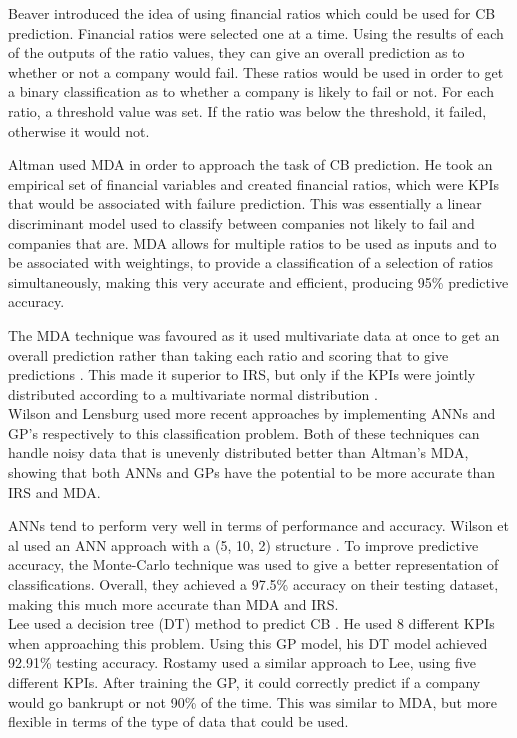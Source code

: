 \documentclass[11pt]{article}
\begin{document}
Beaver introduced the idea of using financial ratios which could be used for CB prediction. Financial ratios were selected one at a time. Using the results of each of the outputs of the ratio values, they can give an overall prediction as to whether or not a company would fail. These ratios would be used in order to get a binary classification as to whether a company is likely to fail or not. For each ratio, a threshold value was set. If the ratio was below the threshold, it failed, otherwise it would not.

Altman used MDA in order to approach the task of CB prediction. He took an empirical set of financial variables and created financial ratios, which were KPIs that would be associated with failure prediction. This was essentially a linear discriminant model used to classify between companies not likely to fail and companies that are. MDA allows for multiple ratios to be used as inputs and to be associated with weightings, to provide a classification of a selection of ratios simultaneously, making this very accurate and efficient, producing 95\% predictive accuracy. 

The MDA technique was favoured as it used multivariate data at once to get an overall prediction rather than taking each ratio and scoring that to give predictions \cite{ref-six}. This made it superior to IRS, but only if the KPIs were jointly distributed according to a multivariate normal distribution \cite{ref-nine}. \\
Wilson  \cite{ref-nine} and Lensburg \cite{ref-ten} used more recent approaches by implementing ANNs and GP's respectively to this classification problem. Both of these techniques can handle noisy data that is unevenly distributed better than Altman's MDA, showing that both ANNs and GPs have the potential to be more accurate than IRS and MDA. 

ANNs tend to perform very well in terms of performance and accuracy. Wilson et al used an ANN approach with a (5, 10, 2) structure \cite{ref-nine}. To improve predictive accuracy, the Monte-Carlo technique was used to give a better representation of classifications. Overall, they achieved a 97.5\% accuracy on their testing dataset, making this much more accurate than MDA and IRS. \\
Lee used a decision tree (DT) method to predict CB \cite{ref-eleven}. He used 8 different KPIs when approaching this problem. Using this GP model, his DT model achieved 92.91\% testing accuracy. Rostamy \cite{ref-twelve} used a similar approach to Lee, using five different KPIs. After training the GP, it could correctly predict if a company would go bankrupt or not 90\% of the time. This was similar to MDA, but more flexible in terms of the type of data that could be used.
\end{document}
